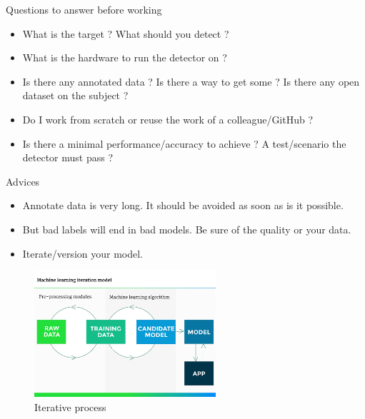 \documentclass{beamer}
\begin{document}
\begin{frame}{Questions to answer before working}
	\begin{itemize}
		\item What is the target ? What should you detect ?
		\item What is the hardware to run the detector on ?
		\item Is there any annotated data ? Is there a way to get some ? Is there any open dataset on the subject ?
		\item Do I work from scratch or reuse the work of a colleague/GitHub ?
		\item Is there a minimal performance/accuracy to achieve ? A test/scenario the detector must pass ?
	\end{itemize}
\end{frame}

\begin{frame}{Advices}
	\begin{itemize}
		\item Annotate data is very long. It should be avoided as soon as is it possible.
		\item But bad labels will end in bad models. Be sure of the quality or your data.
		\item Iterate/version your model.
	\end{itemize}
	\begin{figure}
		\centering
		\includegraphics[width=0.6\textwidth]{images/iteration.jpg}
		\caption{Iterative process}
	\end{figure}
\end{frame}
\end{document}
